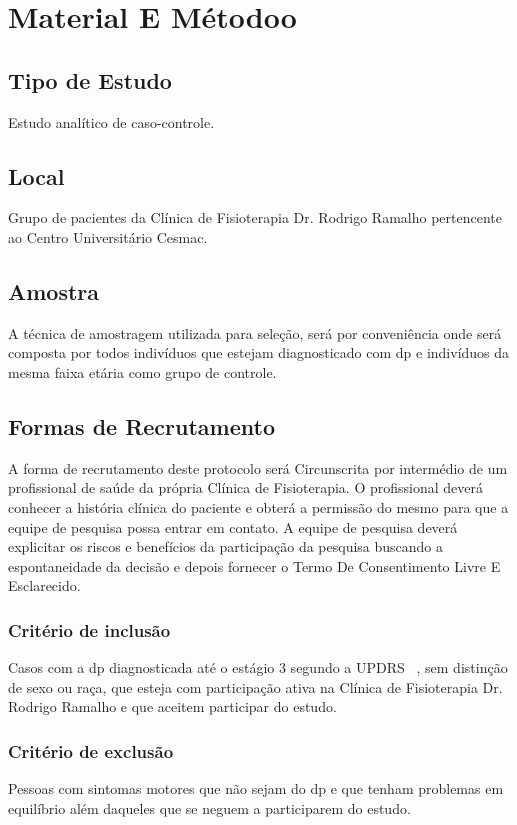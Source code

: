 \section{Material E Métodoo}

\subsection{Tipo de Estudo}
Estudo analítico de caso-controle.


\subsection{Local}
Grupo de pacientes da Clínica de Fisioterapia Dr. Rodrigo Ramalho pertencente ao Centro Universitário Cesmac.


\subsection{Amostra}
A técnica de amostragem utilizada para seleção, será por conveniência onde será composta por todos indivíduos que estejam diagnosticado com \ac{dp} e indivíduos da mesma faixa etária como grupo de controle.

\subsection{Formas de Recrutamento}
A forma de recrutamento deste protocolo será Circunscrita por intermédio de um profissional de saúde da própria Clínica de Fisioterapia. O profissional deverá conhecer a história clínica do paciente e obterá a permissão do mesmo para que a equipe de pesquisa possa entrar em contato.
A equipe de pesquisa deverá explicitar os riscos e benefícios da participação da pesquisa buscando a espontaneidade da decisão e depois fornecer o Termo De Consentimento Livre E Esclarecido.


\subsubsection{Critério de inclusão}
Casos com a \ac{dp} diagnosticada até o estágio 3 segundo a UPDRS ~\cite{updrs87}, sem distinção de sexo ou raça, que esteja com participação ativa na Clínica de Fisioterapia Dr. Rodrigo Ramalho e que aceitem participar do estudo.

\subsubsection{Critério de exclusão}
Pessoas com sintomas motores que não sejam do \ac{dp} e que tenham problemas em equilíbrio além daqueles que se neguem a participarem do estudo.

